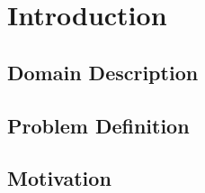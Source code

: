\chapter{Introduction }

\section{Domain Description}

\section{Problem Definition}

\section{Motivation}
